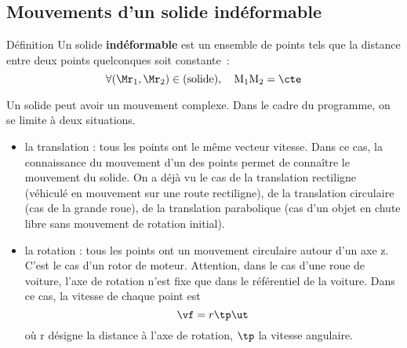 \documentclass[../main/main.tex]{subfiles}
\begin{document}
% 
% 

\subsection{Mouvements d'un solide indéformable}

\begin{tdefi}{Définition}
    Un solide \textbf{indéformable} est un ensemble de points tels que la
    distance entre deux points quelconques soit constante~:
    \[\forall (\Mr_1,\Mr_2) \in ({\rm solide}), \quad {\rm M_1M_2} = \cte\]
\end{tdefi} 

Un solide peut avoir un mouvement complexe. Dans le cadre du programme, on se
limite à deux situations.
\begin{itemize}
    \item la translation : tous les points ont le même vecteur vitesse. Dans ce
        cas, la connaissance du mouvement d’un des points permet de connaître le
        mouvement du solide. On a déjà vu le cas de la translation rectiligne
        (véhiculé en mouvement sur une route rectiligne), de la translation
        circulaire (cas de la grande roue), de la translation parabolique (cas
        d’un objet en chute libre sans mouvement de rotation initial).
    \item la rotation : tous les points ont un mouvement circulaire autour d’un
        axe z. C’est le cas d’un rotor de moteur. Attention, dans le cas d’une
        roue de voiture, l’axe de rotation n’est fixe que dans le référentiel de
        la voiture. Dans ce cas, la vitesse de chaque point est 
        \[\vf = r\tp\ut\]
        où r désigne la distance à l’axe de rotation, $\tp$ la vitesse angulaire.
\end{itemize}
\end{document}
